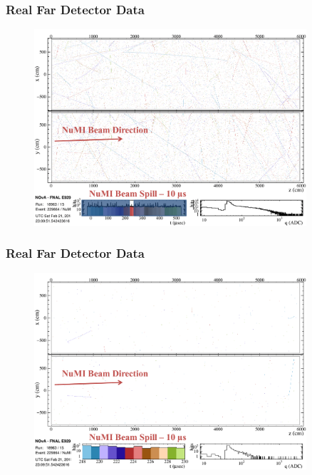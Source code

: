 \documentclass[10pt,professionalfonts,xcolor=table]{beamer}
\begin{document}
\frame
{
  \frametitle{Real Far Detector Data}

 \begin{figure} \includegraphics[width=0.9\textwidth]{figures/evd_steps/evd_beam_dir.png} \end{figure}
}

\frame
{
  \frametitle{Real Far Detector Data}

 \begin{figure} \includegraphics[width=0.9\textwidth]{figures/evd_steps/evd_beam_dir_nu.png} \end{figure}
}
\end{document}
